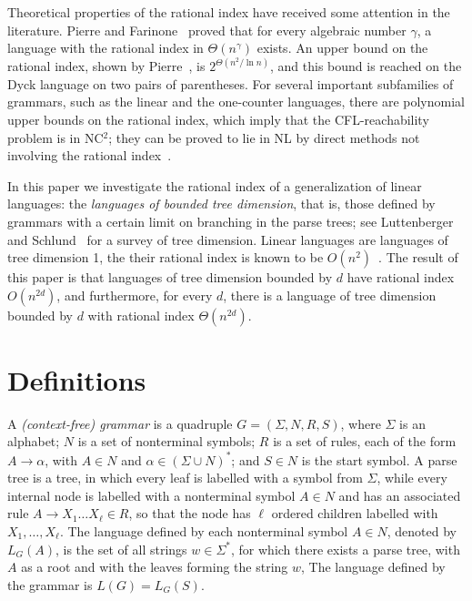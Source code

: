 \documentclass[runningheads]{llncs}
\begin{document}

Theoretical properties of the rational index
have received some attention in the literature.
Pierre and Farinone~\cite{GreibRat} proved that for every algebraic number $\gamma$,
a language with the rational index in $\Theta(n^\gamma)$ exists.
An upper bound on the rational index,
shown by Pierre~\cite{CFRat}, is $2^{\Theta(n^2/\ln n)}$,
and this bound is reached on the Dyck language on two pairs of parentheses.
For several important subfamilies of grammars,
such as the linear and the one-counter languages,
there are polynomial upper bounds on the rational index,
which imply that the CFL-reachability problem is in NC$^2$;
they can be proved to lie in NL
by direct methods not involving the rational index~\cite{labelledGraphs,LReach}.

In this paper we investigate the rational index of a generalization of linear languages:
the \emph{languages of bounded tree dimension},
that is, those defined by grammars
with a certain limit on branching in the parse trees;
see Luttenberger and Schlund~\cite{LuttenbergerSchlund} for a survey of tree dimension.
Linear languages are languages of tree dimension 1,
the their rational index is known to be $O(n^2)$~\cite{RatBasic}.
The result of this paper is that languages of tree dimension bounded by $d$
have rational index $O(n^{2d})$,
and furthermore, for every $d$, there is a language of tree dimension bounded by $d$
with rational index $\Theta(n^{2d})$.






\section{Definitions}\label{section_definitions}

A \textit{(context-free) grammar} is a quadruple $G = (\Sigma, N, R, S)$,
where $\Sigma$ is an alphabet;
$N$ is a set of nonterminal symbols;
$R$ is a set of rules, each of the form $A \to \alpha$,
with $A \in N$ and $\alpha \in (\Sigma \cup N)^*$;
and $S \in N$ is the start symbol.
A parse tree is a tree, in which 
every leaf is labelled with a symbol from $\Sigma$,
while every internal node is labelled with a nonterminal symbol $A \in N$
and has an associated rule $A \to X_1 \ldots X_\ell \in R$,
so that the node has $\ell$ ordered children labelled with $X_1, \ldots, X_\ell$.
The language defined by each nonterminal symbol $A \in N$, denoted by $L_G(A)$,
is the set of all strings $w \in \Sigma^*$,
for which there exists a parse tree,
with $A$ as a root
and with the leaves forming the string $w$,
The language defined by the grammar is $L(G)=L_G(S)$.
\end{document}
